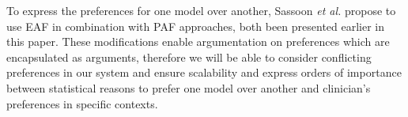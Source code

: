 To express the preferences for one model over another, Sassoon \textit{et al.} \cite{sassoon2016} propose to use \gls{EAF} \cite{Modgil2009} in combination with \gls{PAF} \cite{amgoud,amgoud2000} approaches, both been presented earlier in this paper. These modifications enable argumentation on preferences which are encapsulated as arguments, therefore we will be able to consider conflicting preferences in our system and ensure scalability and express orders of importance between statistical reasons to prefer one model over another and clinician's preferences in specific contexts.



